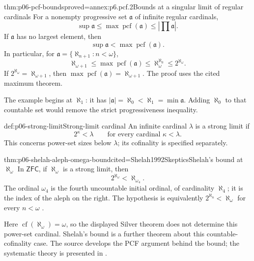 \begin{hbcorollary}{thm:p06-pcf-bounds}{proved=annex:p6.pcf.2}{Bounds at a singular limit of regular cardinals}
For a nonempty progressive set \(\mathfrak a\) of infinite regular
cardinals,
\[
 \sup\mathfrak a\leq\max\operatorname{pcf}(\mathfrak a)
                   \leq\left|\prod\mathfrak a\right|.
\]
If \(\mathfrak a\) has no largest element, then
\[
 \sup\mathfrak a<\max\operatorname{pcf}(\mathfrak a).
\]
In particular, for
\(\mathfrak a=\{\aleph_{n+1}:n<\omega\}\),
\[
 \aleph_{\omega+1}
 \leq\max\operatorname{pcf}(\mathfrak a)
 \leq\aleph_\omega^{\aleph_0}
 \leq2^{\aleph_\omega}.
\]
If \(2^{\aleph_\omega}=\aleph_{\omega+1}\), then
\(\max\operatorname{pcf}(\mathfrak a)=\aleph_{\omega+1}\).
The proof uses the cited maximum theorem.
\end{hbcorollary}

The example begins at \(\aleph_1\): it has
\(|\mathfrak a|=\aleph_0<\aleph_1=\min\mathfrak a\).
Adding \(\aleph_0\) to that countable set would remove the strict
progressiveness inequality.

\begin{hbdefinition}{def:p06-strong-limit}{Strong-limit cardinal}
An infinite cardinal \(\lambda\) is a strong limit if
\[
 2^\kappa<\lambda\qquad\text{for every cardinal }\kappa<\lambda.
\]
This concerns power-set sizes below \(\lambda\); its cofinality is
specified separately.
\end{hbdefinition}

\begin{hbtheorem}{thm:p06-shelah-aleph-omega-bound}{cited=Shelah1992Skeptics}{Shelah's bound at \(\aleph_\omega\)}
In \(\mathsf{ZFC}\), if \(\aleph_\omega\) is a strong limit, then
\[
 2^{\aleph_\omega}<\aleph_{\omega_4}.
\]
The ordinal \(\omega_4\) is the fourth uncountable initial ordinal,
of cardinality \(\aleph_4\); it is the index of the aleph on the right.
The hypothesis is equivalently
\(2^{\aleph_n}<\aleph_\omega\) for every \(n<\omega\)
\cite[Theorem~A]{Shelah1992Skeptics}.
\end{hbtheorem}

Here \(\operatorname{cf}(\aleph_\omega)=\omega\), so the displayed
Silver theorem does not determine this power-set cardinal.
Shelah's bound is a further theorem about this countable-cofinality
case.  The source develops the PCF argument behind the bound; the
systematic theory is presented in \cite{Shelah1994Cardinal}.
